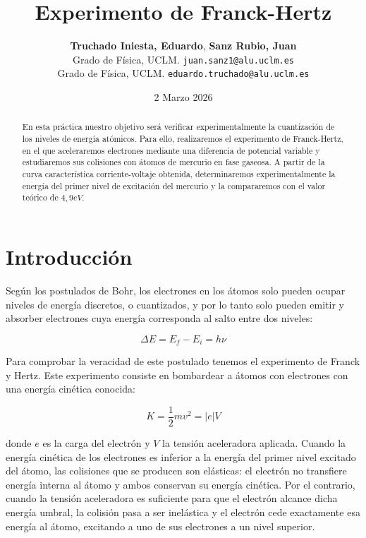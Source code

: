 \documentclass[11pt, a4paper, twocolumn]{article}
\title{\textbf{\Large Experimento de Franck-Hertz}}
\author{
	\textbf{Truchado Iniesta, Eduardo}, \textbf{Sanz Rubio, Juan} \\
	\small Grado de Física, UCLM. \texttt{juan.sanz1@alu.uclm.es} \\
	\small Grado de Física, UCLM. \texttt{eduardo.truchado@alu.uclm.es}
}
\date{\small 2 Marzo 2026}
\begin{document}
\maketitle
\thispagestyle{fancy}


\begin{abstract}

En esta práctica nuestro objetivo será verificar experimentalmente la 
cuantización de los niveles de energía atómicos. Para ello, realizaremos 
el experimento de Franck-Hertz, en el que aceleraremos electrones mediante 
una diferencia de potencial variable y estudiaremos sus colisiones con átomos 
de mercurio en fase gaseosa. A partir de la curva característica 
corriente-voltaje obtenida, determinaremos experimentalmente la energía del 
primer nivel de excitación del mercurio y la compararemos con el valor 
teórico de $4,9 eV$.

\end{abstract}


\section{Introducción}

Según los postulados de Bohr, los electrones en los átomos solo pueden ocupar 
niveles de energía discretos, o cuantizados, y por lo tanto solo pueden emitir 
y absorber electrones cuya energía corresponda al salto entre dos niveles:

\begin{equation}
   \Delta E = E_f - E_i = h\nu
\end{equation}

Para comprobar la veracidad de este postulado tenemos el experimento de 
Franck y Hertz. Este experimento consiste en bombardear a átomos con electrones con una 
energía cinética conocida:

\begin{equation}
   K = \frac{1}{2}mv^2 = |e|V
\end{equation}

donde $e$ es la carga del electrón y $V$ la tensión aceleradora aplicada. 
Cuando la energía cinética de los electrones es inferior a la energía del 
primer nivel excitado del átomo, las colisiones que se producen son 
elásticas: el electrón no transfiere energía interna al átomo y ambos 
conservan su energía cinética. Por el contrario, cuando la tensión 
aceleradora es suficiente para que el electrón alcance dicha energía umbral, 
la colisión pasa a ser inelástica y el electrón cede exactamente esa energía 
al átomo, excitando a uno de sus electrones a un nivel superior.
\end{document}
